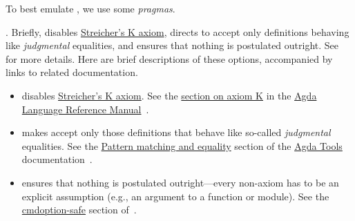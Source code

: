 To best emulate \mltt, we use some \agda \emph{pragmas}.
\begin{code}[inline]%
\>[0]\AgdaSymbol{\{-\#}\AgdaSpace{}%
\AgdaSpace{}%
\AgdaSpace{}%
\AgdaSpace{}%
\AgdaSpace{}%
\AgdaSymbol{\#-\}}\<%
\end{code}
.
\ifshort
Briefly,
 disables
\href{https://ncatlab.org/nlab/show/axiom+K+%28type+theory%29}{Streicher's K axiom},
 directs \agda to accept only definitions behaving like
{\it judgmental} equalities, and
 ensures that nothing is postulated outright.
See~\cite{agdaref-axiomk,agdaref-safeagda,agdatools-patternmatching} for more details.
\else
Here are brief descriptions of these options, accompanied by links to related documentation.
\begin{itemize}
\item
{} disables \href{https://ncatlab.org/nlab/show/axiom+K+%28type+theory%29}{Streicher's K axiom}.
See the \href{https://agda.readthedocs.io/en/v2.6.1/language/without-k.html}{section on axiom K} in
the \href{https://agda.readthedocs.io/en/v2.6.1.3/language}{Agda Language Reference Manual}~\cite{agdaref-axiomk}.
\item
{} makes \agda accept only those definitions that behave like so-called {\it judgmental} equalities.
See the \href{https://agda.readthedocs.io/en/v2.6.1/tools/command-line-options.html#pattern-matching-and-equality}%
{Pattern matching and equality} section of
the \href{https://agda.readthedocs.io/en/v2.6.1.3/tools/}{Agda Tools} documentation~\cite{agdatools-patternmatching}.
\item
{} ensures that nothing is postulated outright---every non-\mltt axiom has to be an explicit assumption (e.g., an argument to a function or module).
See the \href{https://agda.readthedocs.io/en/v2.6.1/tools/command-line-options.html#cmdoption-safe}{cmdoption-safe} section of~\cite{agdaref-safeagda}.
\end{itemize}
\fi

